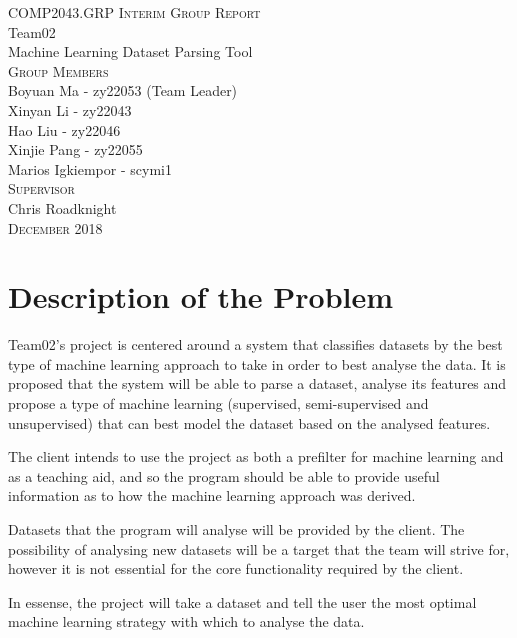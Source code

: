 \documentclass[titlepage]{article}
\begin{document}
\begin{titlepage}
  \centering
  \large{\textsc{COMP2043.GRP Interim Group Report}}\\
  \vspace{3cm}
  \huge{Team02}\\
  \Huge{Machine Learning Dataset Parsing Tool}\\
  \vspace{3cm}
  \LARGE{\textsc{Group Members}}\\
  \Large{Boyuan Ma - zy22053 (Team Leader)}\\
  \Large{Xinyan Li - zy22043}\\
  \Large{Hao Liu - zy22046}\\
  \Large{Xinjie Pang - zy22055}\\
  \Large{Marios Igkiempor - scymi1}\\
  \vspace{1cm}
  \LARGE{\textsc{Supervisor}}\\
  \Large{Chris Roadknight}\\
  \vfill
  \large{\textsc{December 2018}}
  
\end{titlepage}

\tableofcontents
\pagebreak

\section{Description of the Problem}
Team02's project is centered around a system that classifies datasets by the best type of machine learning approach to take in order to best analyse the data. It is proposed that the system will be able to parse a dataset, analyse its features and propose a type of machine learning (supervised, semi-supervised and unsupervised) that can best model the dataset based on the analysed features.

The client intends to use the project as both a prefilter for machine learning and as a teaching aid, and so the program should be able to provide useful information as to how the machine learning approach was derived.

Datasets that the program will analyse will be provided by the client. The possibility of analysing new datasets will be a target that the team will strive for, however it is not essential for the core functionality required by the client.

In essense, the project will take a dataset and tell the user the most optimal machine learning strategy with which to analyse the data.
\end{document}
